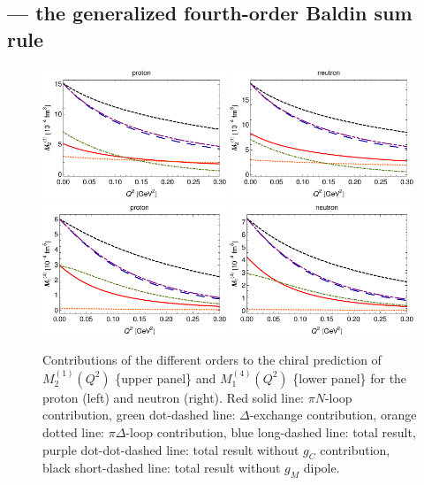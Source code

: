 \documentclass[12pt,preprint,tightenlines,
showpacs,preprintnumbers,amsmath,amssymb,
a4paper,nofootinbib]{revtex4-2}
\begin{document}
\subsection{ --- the generalized fourth-order Baldin sum rule}

\begin{figure}[tbh]
\begin{center}
 \includegraphics[width=0.49\textwidth]{M21p-orders-Dip.pdf}
  \includegraphics[width=0.49\textwidth]{M21n-orders-Dip.pdf}\\[0.2cm]
   \includegraphics[width=0.49\textwidth]{M14p-orders-Dip.pdf}
    \includegraphics[width=0.49\textwidth]{M14n-orders-Dip.pdf}
\caption{\small{Contributions of the different orders to the chiral prediction of $M_2^{(1)}(Q^2)$ \{upper panel\} and $M_1^{(4)}(Q^2)$ \{lower panel\} for the proton (left) and neutron (right). Red solid line: $\pi N$-loop contribution, green dot-dashed line: $\Delta$-exchange contribution, orange dotted line: $\pi \Delta$-loop contribution, blue long-dashed line: total result, purple dot-dot-dashed line: total result without $g_C$ contribution, black short-dashed line: total result without $g_M$ dipole.}\label{Fig:M14-orders}}
\end{center}
\end{figure}
\end{document}
